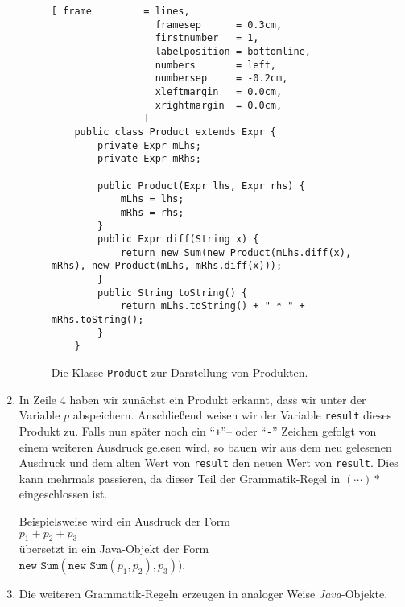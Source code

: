\begin{enumerate}
\begin{figure}[!ht]
\centering
\begin{Verbatim}[ frame         = lines, 
                  framesep      = 0.3cm, 
                  firstnumber   = 1,
                  labelposition = bottomline,
                  numbers       = left,
                  numbersep     = -0.2cm,
                  xleftmargin   = 0.0cm,
                  xrightmargin  = 0.0cm,
                ]
    public class Product extends Expr {
        private Expr mLhs;
        private Expr mRhs;
    
        public Product(Expr lhs, Expr rhs) {
            mLhs = lhs;
            mRhs = rhs;
        }
        public Expr diff(String x) {
            return new Sum(new Product(mLhs.diff(x), mRhs), new Product(mLhs, mRhs.diff(x)));
        }
        public String toString() {
            return mLhs.toString() + " * " + mRhs.toString();
        }
    }
\end{Verbatim}
\vspace*{-0.3cm}
\caption{Die Klasse \texttt{Product} zur Darstellung von Produkten.}
\label{fig:Product.java}
\end{figure}

      
      
\item In Zeile 4 haben wir zun\"achst ein Produkt erkannt, dass wir unter der Variable
      $p$ abspeichern.  Anschlie{\ss}end weisen wir der Variable \texttt{result} dieses
      Produkt zu.  Falls nun sp\"ater noch ein ``\texttt{+}''-- oder ``\texttt{-}''
      Zeichen gefolgt von einem weiteren Ausdruck gelesen wird, so bauen wir aus dem neu
      gelesenen Ausdruck und dem alten Wert von \texttt{result} den neuen Wert von
      \texttt{result}.  Dies kann mehrmals passieren, da dieser Teil der Grammatik-Regel
      in $( \cdots )*$ eingeschlossen ist.
      
      Beispielsweise wird ein Ausdruck der Form
      \\[0.2cm]
      \hspace*{1.3cm}
      $p_1 + p_2 + p_3$
      \\[0.2cm]
      \"ubersetzt in ein Java-Objekt der Form
      \\[0.2cm]
      \hspace*{1.3cm}
      $\texttt{new\ Sum}(\texttt{new\ Sum}(p_1, p_2), p_3))$.       
\item Die weiteren Grammatik-Regeln erzeugen in analoger Weise \textsl{Java}-Objekte.
\end{enumerate}

